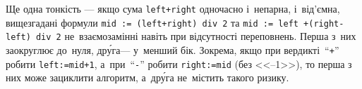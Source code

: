 {Ще одна тонкість --- якщо сума \verb"left+right" одночасно і~\mbox{непар}\-на, і~від'ємна, 
вищезгадані формули
\verb"mid := (left+right) div 2" та
\verb"mid := left +"\nolinebreak[3] \verb"(right-left) div 2" 
не~взаємозамінні навіть при відсутності переповнень.
Перша з~них заокруглює до~нуля, др\'{у}га\nolinebreak[2] --- у~менший бік. 
Зокрема, якщо при вердикті~``\verb"+"'' робити \verb"left:=mid+1", 
а~при~``\verb"-"'' робити \verb"right:=mid" (без <<--1>>),
то перша з них може зациклити алгоритм, а~др\'{у}га не~містить такого ризику.

}
